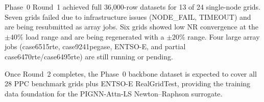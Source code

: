 \documentclass{article}
\begin{document}
Phase~0 Round~1 achieved full 36{,}000-row datasets for 13 of 24 single-node
grids.  Seven grids failed due to infrastructure issues (NODE\_FAIL, TIMEOUT)
and are being resubmitted as array jobs.  Six grids showed low NR convergence
at the $\pm40\%$ load range and are being regenerated with a $\pm20\%$ range.
Four large array jobs (case6515rte, case9241pegase, ENTSO-E, and partial
case6470rte/case6495rte) are still running or pending.

Once Round~2 completes, the Phase~0 backbone dataset is expected to cover all
28 PPC benchmark grids plus ENTSO-E RealGridTest, providing the training data
foundation for the PIGNN-Attn-LS Newton--Raphson surrogate.
\end{document}
